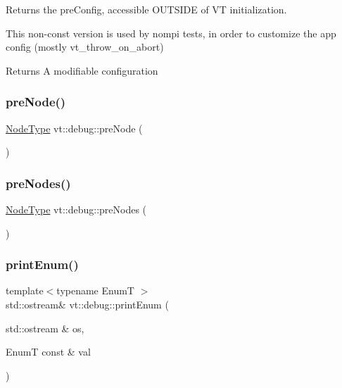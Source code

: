 Returns the pre\+Config, accessible O\+U\+T\+S\+I\+DE of VT initialization. 

This non-\/const version is used by \textquotesingle{}nompi\textquotesingle{} tests, in order to customize the app config (mostly vt\+\_\+throw\+\_\+on\+\_\+abort)

\begin{DoxyReturn}{Returns}
A modifiable configuration 
\end{DoxyReturn}
\mbox{\label{namespacevt_1_1debug_a0f9acc324c2b3308760aa13b29dd9736}} 
\subsubsection{\texorpdfstring{pre\+Node()}{preNode()}}
{\footnotesize\ttfamily \hyperlink{namespacevt_a866da9d0efc19c0a1ce79e9e492f47e2}{Node\+Type} vt\+::debug\+::pre\+Node (\begin{DoxyParamCaption}{ }\end{DoxyParamCaption})}

\mbox{\label{namespacevt_1_1debug_ab9a204b679ea705a255d3cb4dcce02f3}} 
\subsubsection{\texorpdfstring{pre\+Nodes()}{preNodes()}}
{\footnotesize\ttfamily \hyperlink{namespacevt_a866da9d0efc19c0a1ce79e9e492f47e2}{Node\+Type} vt\+::debug\+::pre\+Nodes (\begin{DoxyParamCaption}{ }\end{DoxyParamCaption})}

\mbox{\label{namespacevt_1_1debug_afaa2c8383e718071689dfea2c959a467}} 
\subsubsection{\texorpdfstring{print\+Enum()}{printEnum()}}
{\footnotesize\ttfamily template$<$typename EnumT $>$ \\
std\+::ostream\& vt\+::debug\+::print\+Enum (\begin{DoxyParamCaption}\item[{std\+::ostream \&}]{os,  }\item[{EnumT const \&}]{val }\end{DoxyParamCaption})\hspace{0.3cm}{\ttfamily [inline]}}

